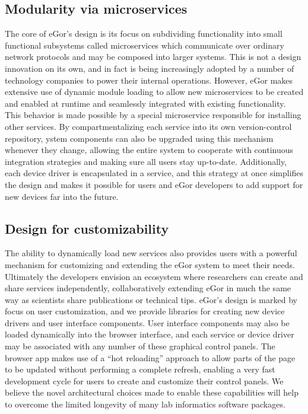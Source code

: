 \documentclass[../thesis]{subfiles}
\begin{document}
\subsection{Modularity via microservices}
The core of eGor's design is its focus on subdividing functionality
into small functional subsystems called microservices which
communicate over ordinary network protocols and may be composed into
larger systems. This is not a design innovation on its own, and in
fact is being increasingly adopted by a number of technology companies
to power their internal operations. However, eGor makes extensive use
of dynamic module loading to allow new microservices to be created and
enabled at runtime and seamlessly integrated with existing
functionality. This behavior is made possible by a special
microservice responsible for installing other services. By
compartmentalizing each service into its own version-control
repository, ystem components can also be upgraded using this mechanism
whenever they change, allowing the entire system to cooperate with
continuous integration strategies and making sure all users stay
up-to-date. Additionally, each device driver is encapsulated in a
service, and this strategy at once simplifies the design and makes it
possible for users and eGor developers to add support for new devices
far into the future.

\subsection{Design for customizability}
The ability to dynamically load new services also provides users with
a powerful mechanism for customizing and extending the eGor system to
meet their needs. Ultimately the developers envision an ecosystem
where researchers can create and share services independently,
collaboratively extending eGor in much the same way as scientists
share publications or technical tips. eGor's design is marked by focus
on user customization, and we provide libraries for creating new
device drivers and user interface components. User interface
components may also be loaded dynamically into the browser interface,
and each service or device driver may be associated with any number of
these graphical control panels. The browser app makes use of a ``hot
reloading'' approach to allow parts of the page to be updated without
performing a complete refresh, enabling a very fast development cycle
for users to create and customize their control panels. We believe
the novel architectural choices made to enable these capabilities will
help to overcome the limited longevity of many lab informatics
software packages.
\end{document}
